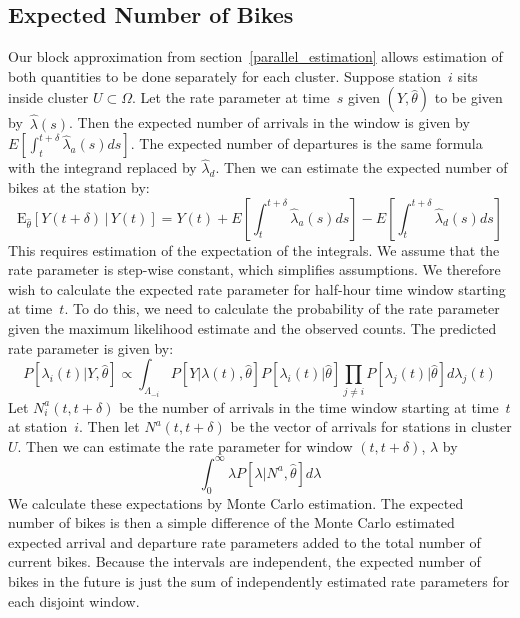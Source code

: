 \documentclass{acm_proc_article-sp}
\begin{document}
\subsection{Expected Number of Bikes}
Our block approximation from section~\ref{parallel_estimation} allows estimation of both quantities to be done separately for each cluster.  Suppose station~$i$ sits inside cluster $U \subset \Omega$.  Let the rate parameter at time~$s$ given $(Y,\hat{\theta})$ to be given by~$\hat{\lambda} (s)$.  Then the expected number of arrivals in the window is given by $ E [ \int_{t}^{t+\delta} \hat{\lambda}_a (s) ds ]$.  The expected number of departures is the same formula with the integrand replaced by $\hat{\lambda}_d$.  Then we can estimate the expected number of bikes at the station by:
\begin{equation*}
\text{E}_{\hat{\theta}} \left[ Y(t+ \delta) \, | \, Y(t) \right] = Y(t) + E [ \int_{t}^{t+\delta} \hat{\lambda}_a (s) ds ] - E[\int_{t}^{t+\delta} \hat{\lambda}_d (s) ds]
\end{equation*}
This requires estimation of the expectation of the integrals.  We assume that the rate parameter is step-wise constant, which simplifies assumptions.  We therefore wish to calculate the expected rate parameter for half-hour time window starting at time~$t$.  To do this, we need to calculate the probability of the rate parameter given the maximum likelihood estimate and the observed counts. The predicted rate parameter is given by:
\begin{equation*}
P [ \lambda_i (t) | Y, \hat{\theta} ] \propto \int_{\Lambda_{-i}} P [ Y | \lambda (t), \hat{\theta} ] P [ \lambda_i (t) | \hat{\theta} ] \prod_{j \neq i} P [ \lambda_j (t) | \hat{\theta} ] d \lambda_j (t)
\end{equation*}
\noindent Let $N^{a}_i(t, t+\delta)$ be the number of arrivals in the time window starting at time~$t$ at station~$i$.  Then let $N^{a} (t, t+\delta)$ be the vector of arrivals for stations in cluster $U$.  Then we can estimate the rate parameter for window $(t, t+\delta)$, $\lambda$ by 
\begin{equation*}
\int_0^\infty \lambda P [ \lambda | N^{a}, \hat{\theta} ] d\lambda
\end{equation*}
\noindent We calculate these expectations by Monte Carlo estimation.  The expected number of bikes is then a simple difference of the Monte Carlo estimated expected arrival and departure rate parameters added to the total number of current bikes.  Because the intervals are independent, the expected number of bikes in the future is just the sum of independently estimated rate parameters for each disjoint window.
\end{document}
